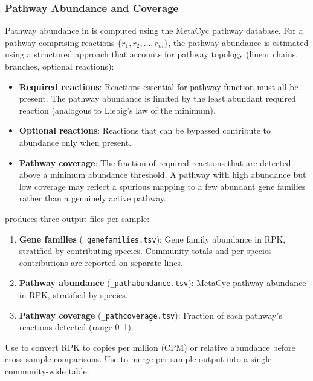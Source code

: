 \subsubsection{Pathway Abundance and Coverage}

Pathway abundance in  is computed using the MetaCyc pathway database. For a pathway comprising reactions $\{r_1, r_2, \ldots, r_m\}$, the pathway abundance is estimated using a structured approach that accounts for pathway topology (linear chains, branches, optional reactions):

\begin{itemize}[nosep]
  \item \textbf{Required reactions}: Reactions essential for pathway function must all be present. The pathway abundance is limited by the least abundant required reaction (analogous to Liebig's law of the minimum).
  \item \textbf{Optional reactions}: Reactions that can be bypassed contribute to abundance only when present.
  \item \textbf{Pathway coverage}: The fraction of required reactions that are detected above a minimum abundance threshold. A pathway with high abundance but low coverage may reflect a spurious mapping to a few abundant gene families rather than a genuinely active pathway.
\end{itemize}

\begin{protocolbox}[title={Interpreting HUMAnN Stratified Output}]
 produces three output files per sample:
\begin{enumerate}[nosep]
  \item \textbf{Gene families} (\texttt{\_genefamilies.tsv}): Gene family abundance in RPK, stratified by contributing species. Community totals and per-species contributions are reported on separate lines.
  \item \textbf{Pathway abundance} (\texttt{\_pathabundance.tsv}): MetaCyc pathway abundance in RPK, stratified by species.
  \item \textbf{Pathway coverage} (\texttt{\_pathcoverage.tsv}): Fraction of each pathway's reactions detected (range 0--1).
\end{enumerate}
Use  to convert RPK to copies per million (CPM) or relative abundance before cross-sample comparisons. Use  to merge per-sample output into a single community-wide table.
\end{protocolbox}

